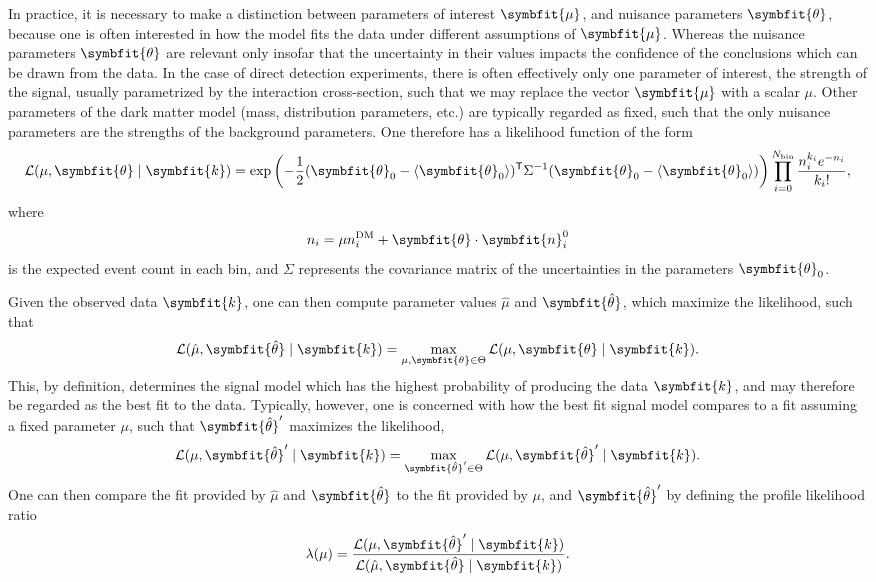 \documentclass[b5paper, 10pt, twoside]{book}
\renewcommand{\vec}[1]{\symbfit{#1}}
\newcommand{\unitv}[1]{\symbfit{\hat{#1}}}
\newcommand{\tmean}[1]{\langle#1\rangle}
\newcommand{\transp}{\mathsf{T}}
\begin{document}
In practice, it is necessary to make a distinction between parameters of interest $\vec{\mu}$, and nuisance parameters $\vec{\theta}$, because one is often interested in how the model fits the data under different assumptions of $\vec{\mu}$. Whereas the nuisance parameters $\vec{\theta}$ are relevant only insofar that the uncertainty in their values impacts the confidence of the conclusions which can be drawn from the data. In the case of direct detection experiments, there is often effectively only one parameter of interest, the strength of the signal, usually parametrized by the interaction cross-section, such that we may replace the vector $\vec{\mu}$ with a scalar $\mu$. Other parameters of the dark matter model (mass, distribution parameters, etc.) are typically regarded as fixed, such that the only nuisance parameters are the strengths of the background parameters. One therefore has a likelihood function of the form
\begin{equation}
    \mathcal{L}(\mu,\vec{\theta}\mid\vec{k})=\exp\left(-\frac{1}{2}(\vec{\theta}_0-\tmean{\vec{\theta}_0})^\transp\Sigma^{-1}(\vec{\theta}_0-\tmean{\vec{\theta}_0})\right)\prod_{i=0}^{N_\text{bin}}\frac{n_i^{k_i}e^{-n_i}}{{k_i}!},
    \label{eq:likelihood}
\end{equation}
where
\begin{equation}
    n_i=\mu n_i^\text{DM}+\vec{\theta}\cdot\vec{n}_i^0
\end{equation}
is the expected event count in each bin, and $\Sigma$ represents the covariance matrix of the uncertainties in the parameters $\vec{\theta}_0$.

Given the observed data $\vec{k}$, one can then compute parameter values $\hat{\mu}$ and $\unitv{\theta}$, which maximize the likelihood, such that
\begin{equation}
    \mathcal{L}(\hat{\mu},\unitv{\theta}\mid\vec{k})=\max_{\mu,\vec{\theta}\in\Theta}\mathcal{L}(\mu,\vec{\theta}\mid\vec{k}).
\end{equation}
This, by definition, determines the signal model which has the highest probability of producing the data $\vec{k}$, and may therefore be regarded as the best fit to the data. Typically, however, one is concerned with how the best fit signal model compares to a fit assuming a fixed parameter $\mu$, such that $\unitv{\theta}'$ maximizes the likelihood,
\begin{equation}
    \mathcal{L}(\mu,\unitv{\theta}'\mid\vec{k})=\max_{\unitv{\theta}'\in\Theta}\mathcal{L}(\mu,\unitv{\theta}'\mid\vec{k}).
\end{equation}
One can then compare the fit provided by $\hat{\mu}$ and $\unitv{\theta}$ to the fit provided by $\mu$, and $\unitv{\theta}'$ by defining the profile likelihood ratio
\begin{equation}
    \lambda(\mu)=\frac{\mathcal{L}(\mu,\unitv{\theta}'\mid\vec{k})}{\mathcal{L}(\hat{\mu},\unitv{\theta}\mid\vec{k})}.
\end{equation}
\end{document}
